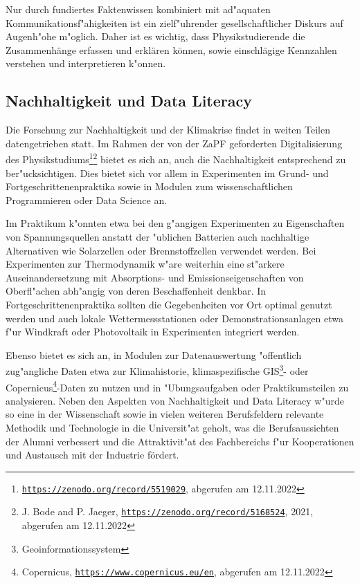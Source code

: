 \documentclass[DIV=calc]{scrartcl}
\newcommand{\zapf}{ZaPF\xspace}
\begin{document}
Nur durch fundiertes Faktenwissen kombiniert mit ad"aquaten Kommunikationsf"ahigkeiten ist ein zielf"uhrender gesellschaftlicher Diskurs auf Augenh"ohe m"oglich. Daher ist es wichtig, dass Physikstudierende die Zusammenhänge erfassen und erklären können, sowie einschlägige Kennzahlen verstehen und interpretieren k"onnen.

\subsection*{Nachhaltigkeit und Data Literacy}


Die Forschung zur Nachhaltigkeit und der Klimakrise findet in weiten Teilen datengetrieben statt. Im Rahmen der von der \zapf geforderten Digitalisierung des Physikstudiums\footnote{\texttt{\url{https://zenodo.org/record/5519029}}, abgerufen am 12.11.2022}\footnote{J. Bode and P. Jaeger, \texttt{\url{https://zenodo.org/record/5168524}}, 2021, abgerufen am 12.11.2022} bietet es sich an, auch die Nachhaltigkeit entsprechend zu ber"ucksichtigen. Dies bietet sich vor allem in Experimenten im Grund- und Fortgeschrittenenpraktika sowie in Modulen zum wissenschaftlichen Programmieren oder Data Science an. 

Im Praktikum k"onnten etwa bei den g"angigen Experimenten zu Eigenschaften von Spannungsquellen anstatt der "ublichen Batterien auch nachhaltige Alternativen wie Solarzellen oder Brennstoffzellen verwendet werden. Bei Experimenten zur Thermodynamik w"are weiterhin eine st"arkere Auseinandersetzung mit Absorptions- und Emissionseigenschaften von Oberfl"achen abh"angig von deren Beschaffenheit denkbar. In Fortgeschrittenenpraktika sollten die Gegebenheiten vor Ort optimal genutzt werden und auch lokale Wettermessstationen oder Demonstrationsanlagen etwa f"ur Windkraft oder Photovoltaik in Experimenten integriert werden.%

Ebenso bietet es sich an, in Modulen zur Datenauswertung "offentlich zug"angliche Daten etwa zur Klimahistorie, klimaspezifische GIS\footnote{Geoinformationssystem}- oder Copernicus\footnote{Copernicus, \texttt{\url{https://www.copernicus.eu/en}}, abgerufen am 12.11.2022}-Daten zu nutzen und in "Ubungsaufgaben oder Praktikumsteilen zu analysieren. Neben den Aspekten von Nachhaltigkeit und Data Literacy w"urde so eine in der Wissenschaft sowie in vielen weiteren Berufsfeldern relevante Methodik und Technologie in die Universit"at geholt, was die Berufsaussichten der Alumni verbessert und die Attraktivit"at des Fachbereichs f"ur Kooperationen und Austausch mit der Industrie fördert.
\end{document}
